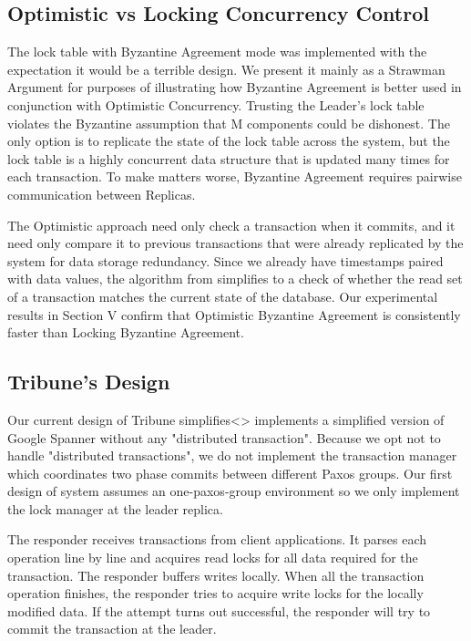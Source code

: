 \documentclass[10pt,twocolumn]{article}
\begin{document}
\subsection{Optimistic vs Locking Concurrency Control}

The lock table with Byzantine Agreement mode was implemented with the expectation it would be a terrible design. We present it mainly as a Strawman Argument for purposes of illustrating how Byzantine Agreement is better used in conjunction with Optimistic Concurrency. Trusting the Leader's lock table  violates the Byzantine assumption that M components could be dishonest. The only option is to replicate the state of the lock table across the system, but the lock table is a highly concurrent data structure that is updated many times for each transaction. To make matters worse, Byzantine Agreement requires pairwise communication between Replicas.

The Optimistic approach need only check a transaction when it commits, and it need only compare it to previous transactions that were already replicated by the system for data storage redundancy. Since we already have timestamps paired with data values, the algorithm from  \cite{adya_efficient_1995} simplifies to a check of whether the read set of a transaction matches the current state of the database. Our experimental results in Section V confirm that Optimistic Byzantine Agreement is consistently faster than Locking Byzantine Agreement.

\subsection{Tribune's Design}
Our current design of Tribune simplifies<> implements a simplified version of Google Spanner without any "distributed transaction". Because we opt not to handle "distributed transactions", we do not implement the transaction manager which coordinates two phase commits between different Paxos groups. Our first design of system assumes an one-paxos-group environment so we only implement the lock manager at the leader replica.

The responder receives transactions from client applications. It parses each operation line by line and acquires read locks for all data required for the transaction. The responder buffers writes locally. When all the transaction operation finishes, the responder tries to acquire write locks for the locally modified data. If the attempt turns out successful, the responder will try to commit the transaction at the leader. 
\end{document}
